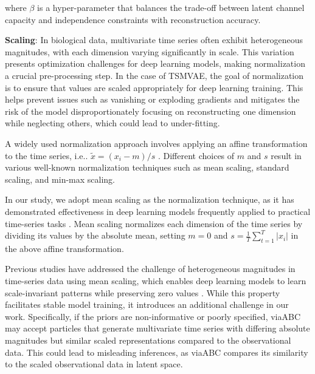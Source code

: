 \documentclass[12pt]{article} %
\begin{document}
where $\beta$ is a hyper-parameter that balances the trade-off between latent channel capacity and independence constraints with reconstruction accuracy\citep{higgins2017beta}.


%

\textbf{Scaling}: In biological data, multivariate time series often exhibit heterogeneous magnitudes, with each dimension varying significantly in scale. This variation presents optimization challenges for deep learning models, making normalization a crucial pre-processing step. In the case of TSMVAE, the goal of normalization is to ensure that values are scaled appropriately for deep learning training. This helps prevent issues such as vanishing or exploding gradients and mitigates the risk of the model disproportionately focusing on reconstructing one dimension while neglecting others, which could lead to under-fitting.

A widely used normalization approach involves applying an affine transformation to the time series, i.e.. $\tilde{x} = {(x_i - m)}/{s}$ \citep{rabanser2020effectiveness}\citep{ansari2024chronos}. Different choices of $m$ and $s$ result in  various well-known normalization techniques such as mean scaling, standard scaling, and min-max scaling.

In our study, we adopt mean scaling as the normalization technique, as it has demonstrated effectiveness in deep learning models frequently applied to practical time-series tasks \citep{salinas2020deepar}\citep{rabanser2020effectiveness} \citep{ansari2024chronos}. Mean scaling normalizes each dimension of the time series by dividing its values by the absolute mean, setting $m = 0$ and $s= \frac{1}{T} \sum_{t=1}^{T}|x_i|$ in the above affine transformation. 

Previous studies have addressed the challenge of heterogeneous magnitudes in time-series data using mean scaling, which enables deep learning models to learn scale-invariant patterns while preserving zero values \citep{ansari2024chronos}. While this property facilitates stable model training, it introduces an additional challenge in our work. Specifically, if the priors are non-informative or poorly specified, viaABC may accept particles that generate multivariate time series with differing absolute magnitudes but similar scaled representations compared to the observational data. This could lead to misleading inferences, as viaABC compares its similarity to the scaled observational data in latent space. 
\end{document}
